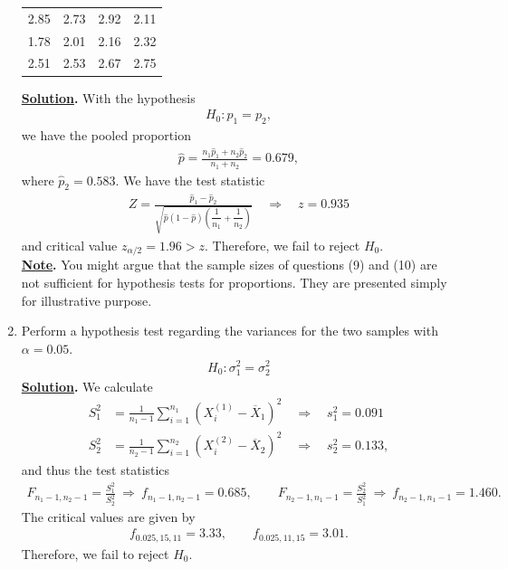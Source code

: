 \begin{enumerate}
\begin{table}[H]
		\centering
		\begin{tabular}{cccc}
			2.85 & 2.73 & 2.92 & 2.11 \\
			1.78 & 2.01 & 2.16 & 2.32 \\
			2.51 & 2.53 & 2.67 & 2.75
		\end{tabular}
	\end{table}
	\textbf{\underline{Solution}.} With the hypothesis
	\begin{align*}
	H_0: p_1 = p_2,
	\end{align*}
	we have the pooled proportion
	\begin{align*}
	\widehat{p} = \frac{n_1\widehat{p}_1 + n_2\widehat{p}_2}{n_1 + n_2} = 0.679,
	\end{align*}
	where $\widehat{p}_2 = 0.583$. We have the test statistic
	\begin{align*}
	Z = \frac{\widehat{p}_1 - \widehat{p}_2}{\sqrt{\widehat{p}(1-\widehat{p})\left(\dfrac{1}{n_1} + \dfrac{1}{n_2} \right)}} \quad\Rightarrow\quad z = 0.935
	\end{align*}
	and critical value $z_{\alpha/2} = 1.96 > z$. Therefore, we fail to reject $H_0$.\\
	\textbf{\underline{Note}.} You might argue that the sample sizes of questions (9) and (10) are not sufficient for hypothesis tests for proportions. They are presented simply for illustrative purpose.
	\item Perform a hypothesis test regarding the variances for the two samples with $\alpha = 0.05$.
	\begin{align*}
	H_0: \sigma_1^2 = \sigma_2^2
	\end{align*}
	\textbf{\underline{Solution}.} We calculate
	\begin{align*}
	S_1^2 & = \frac{1}{n_1-1}\sum_{i=1}^{n_1}(X_i^{(1)}-\overline{X}_1)^2\quad\Rightarrow\quad s_1^2 = 0.091  \\
	S_2^2 & = \frac{1}{n_2-1}\sum_{i=1}^{n_2}(X_i^{(2)}-\overline{X}_2)^2 \quad\Rightarrow\quad s_2^2 = 0.133,
	\end{align*}
	and thus the test statistics
	\begin{align*}
	F_{n_1-1,n_2-1} = \frac{S_1^2}{S_2^2}\ \Rightarrow\  f_{n_1-1,n_2-1} = 0.685, \qquad F_{n_2-1,n_1-1} = \frac{S_2^2}{S_1^2}\ \Rightarrow\  f_{n_2-1,n_1-1} = 1.460.
	\end{align*}
	The critical values are given by
	\begin{align*}
	f_{0.025, 15, 11} = 3.33, \qquad f_{0.025, 11, 15} = 3.01.
	\end{align*}
	Therefore, we fail to reject $H_0$.
\end{enumerate}
